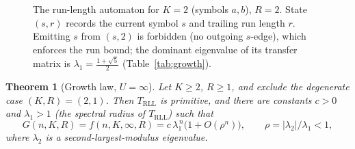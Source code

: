 \documentclass[a4paper,12pt]{article}
\newtheorem{theorem}{Theorem}
\begin{document}
\begin{figure}[H]
\centering
{}
\caption{The run-length automaton for $K=2$ (symbols $a,b$), $R=2$.
State $(s,r)$ records the current symbol $s$ and trailing run length
$r$. Emitting $s$ from $(s,2)$ is forbidden (no outgoing $s$-edge),
which enforces the run bound; the dominant eigenvalue of its transfer
matrix is $\lambda_1=\tfrac{1+\sqrt5}{2}$ (Table~\ref{tab:growth}).}
\label{fig:automaton}
\end{figure}

\begin{theorem}[Growth law, $U=\infty$]\label{thm:growth}
Let $K\ge 2$, $R\ge 1$, and exclude the degenerate case $(K,R)=(2,1)$.
Then $T_{\mathrm{RLL}}$ is primitive, and there are constants $c>0$
and $\lambda_1>1$ (the spectral radius of $T_{\mathrm{RLL}}$) such that
\begin{equation}
G(n,K,R)=f(n,K,\infty,R)=c\,\lambda_1^{\,n}\bigl(1+O(\rho^n)\bigr),
\qquad \rho=|\lambda_2|/\lambda_1<1,
\end{equation}
where $\lambda_2$ is a second-largest-modulus eigenvalue.
\end{theorem}
\end{document}
